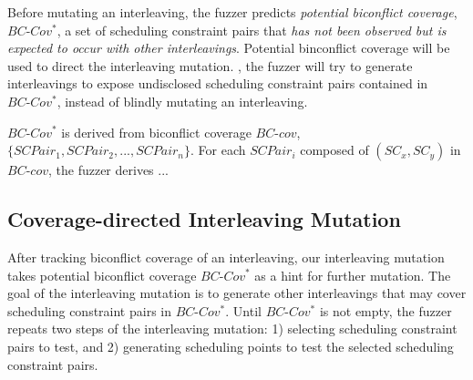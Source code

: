 Before mutating an interleaving, the fuzzer predicts \textit{potential
  biconflict coverage}, $BC\mbox{-}Cov^*$, a set of scheduling
constraint pairs that \textit{has not been observed but is expected to
  occur with other interleavings}.
%
Potential binconflict coverage will be used to direct the interleaving
mutation. \ie, the fuzzer will try to generate interleavings to expose
undisclosed scheduling constraint pairs contained in
$BC\mbox{-}Cov^*$, instead of blindly mutating an interleaving.


$BC\mbox{-}Cov^*$ is derived from biconflict coverage $BC\mbox{-}cov$,
$\{SCPair_1, SCPair_2, ..., SCPair_n\}$.
%
For each $SCPair_i$ composed of $(SC_x, SC_y)$ in $BC\mbox{-}cov$, the
fuzzer derives ...



\subsection{Coverage-directed Interleaving Mutation}
\label{ss:scheduler}



\newcommand{\segment}{segment graph\xspace}
\newcommand{\segments}{segment graphs\xspace}
\newcommand{\Segments}{Segment graphs\xspace}


After tracking biconflict coverage of an interleaving, our
interleaving mutation takes potential biconflict coverage
$BC\mbox{-}Cov^*$ as a hint for further mutation.
%
The goal of the interleaving mutation is to generate other
interleavings that may cover scheduling constraint pairs in
$BC\mbox{-}Cov^*$.
%
Until $BC\mbox{-}Cov^*$ is not empty, the fuzzer repeats two steps of
the interleaving mutation:
%
1) selecting scheduling constraint pairs to test, and
2) generating scheduling points to test the selected scheduling
constraint pairs.

